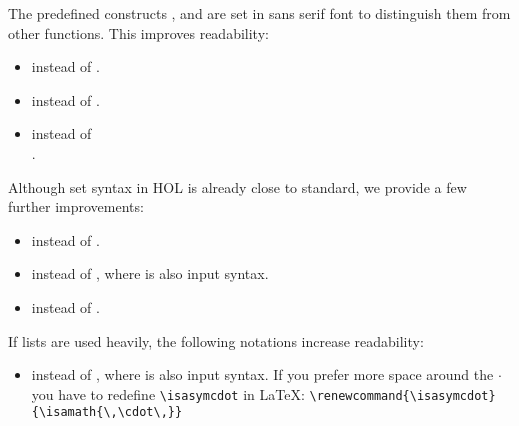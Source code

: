 \begin{isabellebody}
\begin{isamarkuptext}
The predefined constructs ,  and
 are set in sans serif font to distinguish them from
other functions. This improves readability:
\begin{itemize}
\item {} instead of .
\item {} instead of .
\item {} instead of\\
      .
\end{itemize}%
\end{isamarkuptext}%
\isamarkuptrue%
%
\isamarkuptrue%
%
\begin{isamarkuptext}%
Although set syntax in HOL is already close to
standard, we provide a few further improvements:
\begin{itemize}
\item {} instead of .
\item \isa{{\isasymemptyset}} instead of \isa{{\isacharbraceleft}{\isacharbraceright}}, where
 \isa{{\isasymemptyset}} is also input syntax.
\item {} instead of .
\end{itemize}%
\end{isamarkuptext}%
\isamarkuptrue%
%
\isamarkuptrue%
%
\begin{isamarkuptext}%
If lists are used heavily, the following notations increase readability:
\begin{itemize}
\item {} instead of ,
      where  is also input syntax.
If you prefer more space around the $\cdot$ you have to redefine
\verb!\isasymcdot! in \LaTeX:
\verb!\renewcommand{\isasymcdot}{\isamath{\,\cdot\,}}!


\end{itemize}
\end{isamarkuptext}
\end{isabellebody}
